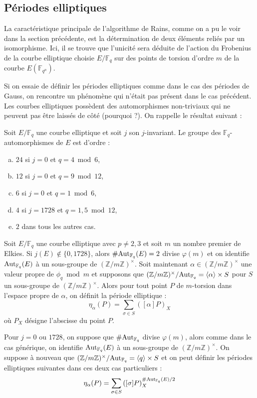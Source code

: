 \documentclass[a4paper]{article} %
\numberwithin{section}{part}
\numberwithin{equation}{section}
\newcommand\zmodninv[1]{(\mathbb{Z}/#1\mathbb{Z})^{\times}}
\newcommand\GF[1]{\mathbb{F}_{#1}}
\newcommand\groupgen[1]{\langle{#1}\rangle}
\begin{document}
\subsection{Périodes elliptiques}
\label{sec:perell}
La caractéristique principale de l'algorithme de Rains, comme on a pu le voir
dans la section précédente, est la détermination de deux éléments reliés
par un isomorphisme. Ici, il se trouve que l'unicité sera déduite de
l'action du Frobenius de la courbe elliptique choisie $E/\GF{q}$ sur des points
de torsion d'ordre $m$ de la courbe $E(\GF{q^n})$.\par
Si on essaie de définir les périodes elliptiques comme dans le cas des périodes
de Gauss, on rencontre un phénomène qui n'était pas présent dans le cas
précédent. Les courbes elliptiques possèdent des automorphismes non-triviaux qui
ne peuvent pas être laissés de côté (pourquoi ?). On rappelle le résultat 
suivant :
\begin{prop}
Soit $E/\GF{q}$ une courbe elliptique et soit $j$ son $j$-invariant. Le groupe
des $\GF{q}$-automorphismes de $E$ est d'ordre :
\begin{enumerate}[(a)]
    \item $24$ si $j = 0$ et $q = 4\bmod{6}$,
    \item $12$ si $j = 0$ et $q = 9\bmod{12}$,
    \item $6$ si $j = 0$ et $q = 1\bmod{6}$,
    \item $4$ si $j = 1728$ et $q = 1, 5\bmod{12}$,
    \item $2$ dans tous les autres cas.
\end{enumerate}
\end{prop}
\begin{defn}
Soit $E/\GF{q}$ une courbe elliptique avec $p\neq2, 3$ et soit $m$
un nombre premier de Elkies. Si $j(E)\notin\lbrace{0, 1728}\rbrace$, alors
$\#\textup{Aut}_{\GF{q}}(E) = 2$ divise $\varphi(m)$ et on identifie
$\textup{Aut}_{\GF{q}}(E)$ à un sous-groupe de $\zmodninv{m}$. Soit maintenant
$\alpha\in\zmodninv{m}$ une valeur propre de $\phi_q\bmod{m}$ et supposons que
$\zmodninv{m}/\textup{Aut}_{\GF{q}} = \groupgen{\alpha}\times S$ pour $S$ un 
sous-groupe de $\zmodninv{m}$. Alors pour tout point $P$ de $m$-torsion dans 
l'espace propre de $\alpha$, on définit la période elliptique :
\begin{equation}
\eta_{\alpha}(P) = \sum_{\sigma\in S}{([\alpha]P)_X}
\end{equation}
où $P_X$ désigne l'abscisse du point $P$.\par
Pour $j = 0$ ou $1728$, on suppose que $\#\textup{Aut}_{\GF{q}}$ divise
$\varphi(m)$, alors comme dans le cas générique, on identifie
$\textup{Aut}_{\GF{q}}(E)$ à un sous-groupe de $\zmodninv{m}$. On suppose à
nouveau que $\zmodninv{m}/\textup{Aut}_{\GF{q}} = \groupgen{q}\times S$ et on 
peut définir les périodes elliptiques suivantes dans ces deux cas particuliers :
\begin{equation}
\eta_{\alpha}(P) = \sum_{\sigma\in S}
{\left([\sigma]P\right)_X^{\#\textup{Aut}_{\GF{q}}(E)/2}}
\end{equation}
\end{defn}
\end{document}
